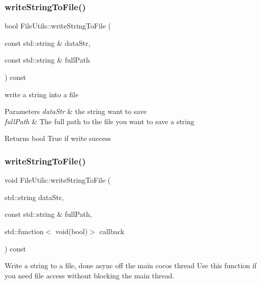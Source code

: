 \subsubsection{\texorpdfstring{write\+String\+To\+File()}{writeStringToFile()}\hspace{0.1cm}{\footnotesize\ttfamily [2/3]}}
{\footnotesize\ttfamily bool File\+Utils\+::write\+String\+To\+File (\begin{DoxyParamCaption}\item[{const std\+::string \&}]{data\+Str,  }\item[{const std\+::string \&}]{full\+Path }\end{DoxyParamCaption}) const\hspace{0.3cm}{\ttfamily [virtual]}}

write a string into a file


\begin{DoxyParams}{Parameters}
{\em data\+Str} & the string want to save \\
\hline
{\em full\+Path} & The full path to the file you want to save a string \\
\hline
\end{DoxyParams}
\begin{DoxyReturn}{Returns}
bool True if write success 
\end{DoxyReturn}
\mbox{\label{classFileUtils_a053cc5146cc3a8aca08699f6707f8883}} 
\subsubsection{\texorpdfstring{write\+String\+To\+File()}{writeStringToFile()}\hspace{0.1cm}{\footnotesize\ttfamily [3/3]}}
{\footnotesize\ttfamily void File\+Utils\+::write\+String\+To\+File (\begin{DoxyParamCaption}\item[{std\+::string}]{data\+Str,  }\item[{const std\+::string \&}]{full\+Path,  }\item[{std\+::function$<$ void(bool)$>$}]{callback }\end{DoxyParamCaption}) const\hspace{0.3cm}{\ttfamily [virtual]}}

Write a string to a file, done async off the main cocos thread Use this function if you need file access without blocking the main thread.

